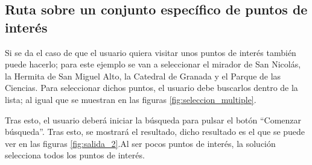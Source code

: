 \subsection[Caso 2]{Ruta sobre un conjunto específico de puntos de interés}
Si se da el caso de que el usuario quiera visitar unos puntos de interés también puede hacerlo; para este ejemplo se van a seleccionar el mirador de San Nicolás, la Hermita de San Miguel Alto, la Catedral de Granada y el Parque de las Ciencias. Para seleccionar dichos puntos, el usuario debe buscarlos dentro de la lista; al igual que se muestran en las figuras \ref{fig:seleccion_multiple}.\newline

Tras esto, el usuario deberá iniciar la búsqueda para pulsar el botón \enquote{Comenzar búsqueda}. Tras esto, se mostrará el resultado, dicho resultado es el que se puede ver en las figuras \ref{fig:salida_2}.Al ser pocos puntos de interés, la solución selecciona todos los puntos de interés.\newline

